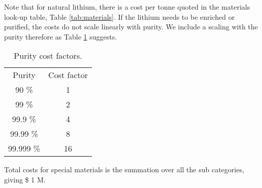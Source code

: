 Note that for natural lithium, there is a cost per tonne quoted in the materials look-up table, Table \ref{tab:materials}.  If the lithium needs to be enriched or purified, the costs do not scale linearly with purity.  We include a scaling with the purity therefore as Table \ref{tab:purity} suggests.

\begin{table}[]
    \centering
    \begin{tabular}{c|c}
       Purity  &  Cost factor \\
       90 \%  &  1 \\
       99 \%  &  2 \\
       99.9 \%  &  4 \\
       99.99 \%  &  8 \\
       99.999 \%  &  16 \\
    \end{tabular}
    \caption{Purity cost factors.}
    \label{tab:purity}
\end{table}

Total costs for special materials is the summation over all the sub categories, giving \$ 1 M.  



